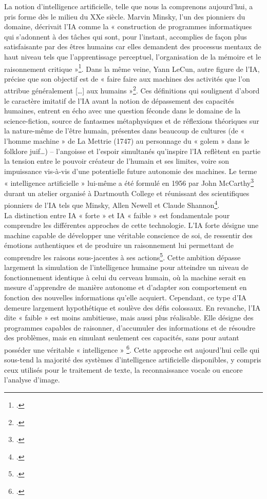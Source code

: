 La notion d’intelligence artificielle, telle que nous la comprenons aujourd’hui, a pris forme dès le milieu du XXe siècle. Marvin Minsky, l’un des pionniers du domaine, décrivait l’IA comme la « construction de programmes informatiques qui s’adonnent à des tâches qui sont, pour l’instant, accomplies de façon plus satisfaisante par des êtres humains car elles demandent des processus mentaux de haut niveau tels que l’apprentissage perceptuel, l’organisation de la mémoire et le raisonnement critique »\footcite{puren_intelligence_2020}. 
Dans la même veine, Yann LeCun, autre figure de l’IA, précise que son objectif est de « faire faire aux machines des activités que l’on attribue généralement […] aux humains »\footcite{saporta_breve_2018}. 
Ces définitions qui soulignent d’abord le caractère imitatif de l’IA avant la notion de dépassement des capacités humaines, entrent en écho avec une question féconde dans le domaine de la science-fiction, source de fantasmes métaphysiques et de réflexions théoriques sur la nature-même de l’être humain, présentes dans beaucoup de cultures (de « l’homme machine » de La Mettrie (1747) au personnage du « golem » dans le folklore juif…) – l’angoisse et l’espoir simultanés qu’inspire l’IA reflètent en partie la tension entre le pouvoir créateur de l’humain et ses limites, voire son impuissance vis-à-vis d’une potentielle future autonomie des machines. 
Le terme « intelligence artificielle » lui-même a été formulé en 1956 par John McCarthy\footcite{bermes_patrimoine_2020} durant un atelier organisé à Dartmouth College et réunissant des scientifiques pionniers de l’IA tels que Minsky, Allen Newell et Claude Shannon\footcite{puren_intelligence_2020}. 
\newline
{}\\

La distinction entre IA « forte » et IA « faible » est fondamentale pour comprendre les différentes approches de cette technologie. L’IA forte désigne une machine capable de développer une véritable conscience de soi, de ressentir des émotions authentiques et de produire un raisonnement lui permettant de comprendre les raisons sous-jacentes à ses actions\footcite{puren_intelligence_2020}. Cette ambition dépasse largement la simulation de l’intelligence humaine pour atteindre un niveau de fonctionnement identique à celui du cerveau humain, où la machine serait en mesure d’apprendre de manière autonome et d’adapter son comportement en fonction des nouvelles informations qu’elle acquiert. Cependant, ce type d’IA demeure largement hypothétique et soulève des défis colossaux.
En revanche, l’IA dite « faible » est moins ambitieuse, mais aussi plus réalisable. Elle désigne des programmes capables de raisonner, d’accumuler des informations et de résoudre des problèmes, mais en simulant seulement ces capacités, sans pour autant posséder une véritable « intelligence » \footcite{puren_intelligence_2020}. Cette approche est aujourd’hui celle qui sous-tend la majorité des systèmes d’intelligence artificielle disponibles, y compris ceux utilisés pour le traitement de texte, la reconnaissance vocale ou encore l’analyse d’image.
\newline
{}\\

